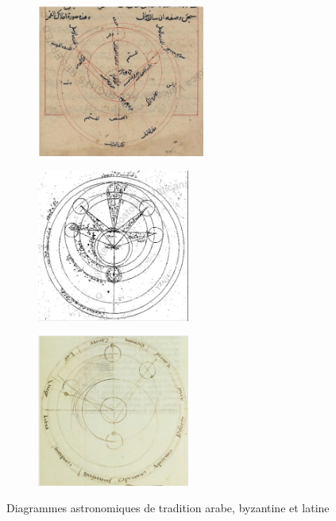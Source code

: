 	\begin{figure}[h]
		\begin{subfigure}{0.34\linewidth}
			\centering
			\includegraphics[width=5.5cm]{images/modele_lune_arabe.png}
		\end{subfigure}
		\hspace{1pt}
		\begin{subfigure}{0.30\linewidth}
			\centering
			\includegraphics[width=5cm]{images/modele_lune_byz.png}
		\end{subfigure}
  		\hspace{1pt}
  		\begin{subfigure}{0.30\linewidth}
			\centering
			\includegraphics[width=5cm]{images/modele_lune_latin.png}
		\end{subfigure}
		\caption{Diagrammes astronomiques de tradition arabe, byzantine et latine}
		\label{fig:modeles_lune}
	\end{figure}

